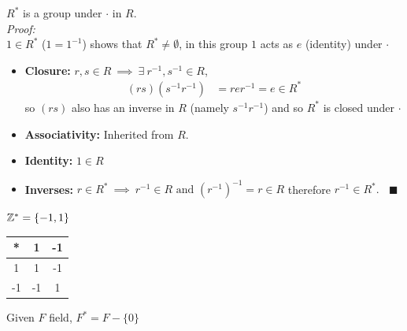 \begin{proposition}
    $R^*$ is a group under $\cdot$ in $R$. \\

    \noindent \textit{Proof:} \\
    \indent $1\in R^*$  ($1=1^{-1}$) shows that $R^* \neq \emptyset$, in this group $1$ acts as $e$ (identity) under $\cdot$
    \begin{itemize}
        \item \textbf{Closure:} $r,s \in R \ \implies \ \exists \ r^{-1},s^{-1} \in R$, 
        \begin{align}
            (rs)(s^{-1}r^{-1})&= rer^{-1}=e \in R^* \nonumber
        \end{align}
        so $(rs)$ also has an inverse in $R$ (namely $s^{-1}r^{-1}$) and so $R^*$ is closed under $\cdot$
        \item \textbf{Associativity:} Inherited from $R$.
        \item \textbf{Identity:} $1\in R$
        \item \textbf{Inverses:} $r\in R^* \ \implies \ r^{-1} \in R \text{ and } (r^{-1})^{-1}=r\in R$ therefore $r^{-1}\in R^*. \ \ \ \ \blacksquare$
    \end{itemize}
\end{proposition}

\begin{example}
    ${\mathbb{ Z}}^{*}= \{-1,1\}$ \\ \steezybreak
    
    \begin{tabular}{|c|c|c|}
        *&1&-1 \\ \hline
        1&1&-1 \\ \hline
        -1&-1&1 
    \end{tabular}
\end{example}
\begin{example} 
    Given $F$ field, $F^*=F-\{0\}$
\end{example}

